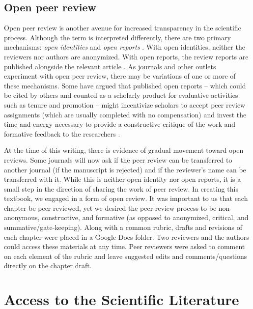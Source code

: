\documentclass[
  11pt,
]{book}
\begin{document}
\hypertarget{open-peer-review}{%
\subsection{Open peer review}\label{open-peer-review}}

Open peer review is another avenue for increased transparency in the scientific process. Although the term is interpreted differently, there are two primary mechanisms: \emph{open identities} and \emph{open reports} \citep{ross-hellauer_what_2017}. With open identities, neither the reviewers nor authors are anonymized. With open reports, the review reports are published alongside the relevant article \citep{ross-hellauer_what_2017}. As journals and other outlets experiment with open peer review, there may be variations of one or more of these mechanisms. Some have argued that published open reports -- which could be cited by others and counted as a scholarly product for evaluative activities such as tenure and promotion -- might incentivize scholars to accept peer review assignments (which are usually completed with no compensation) and invest the time and energy necessary to provide a constructive critique of the work and formative feedback to the researchers \citep{bezjak_open_2018}.

At the time of this writing, there is evidence of gradual movement toward open reviews. Some journals will now ask if the peer review can be transferred to another journal (if the manuscript is rejected) and if the reviewer's name can be transferred with it. While this is neither open identity nor open reports, it is a small step in the direction of sharing the work of peer review.
In creating this textbook, we engaged in a form of open review. It was important to us that each chapter be peer reviewed, yet we desired the peer review process to be non-anonymous, constructive, and formative (as opposed to anonymized, critical, and summative/gate-keeping). Along with a common rubric, drafts and revisions of each chapter were placed in a Google Docs folder. Two reviewers and the authors could access these materials at any time. Peer reviewers were asked to comment on each element of the rubric and leave suggested edits and comments/questions directly on the chapter draft.

\hypertarget{access-to-the-scientific-literature}{%
\section{Access to the Scientific Literature}\label{access-to-the-scientific-literature}}
\end{document}
